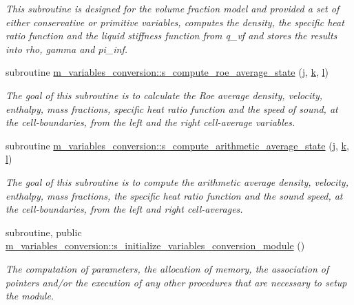 \begin{DoxyCompactItemize}
\begin{DoxyCompactList}\small\item\em This subroutine is designed for the volume fraction model and provided a set of either conservative or primitive variables, computes the density, the specific heat ratio function and the liquid stiffness function from q\+\_\+vf and stores the results into rho, gamma and pi\+\_\+inf. \end{DoxyCompactList}\item 
subroutine \hyperlink{namespacem__variables__conversion_a4cf9b21c0dfd924ac807585579240486}{m\+\_\+variables\+\_\+conversion\+::s\+\_\+compute\+\_\+roe\+\_\+average\+\_\+state} (\hyperlink{m__rhs_8f90_aeadbc0ce9b66517f8fde156199772ec1}{j}, \hyperlink{m__rhs_8f90_af22c486581933c52df7d4aa306382074}{k}, \hyperlink{m__rhs_8f90_a2ac747380de0e6e5e11b01f4137fb75c}{l})
\begin{DoxyCompactList}\small\item\em The goal of this subroutine is to calculate the Roe average density, velocity, enthalpy, mass fractions, specific heat ratio function and the speed of sound, at the cell-\/boundaries, from the left and the right cell-\/average variables. \end{DoxyCompactList}\item 
subroutine \hyperlink{namespacem__variables__conversion_a825db8aee0af3c120a7ca1f8de814490}{m\+\_\+variables\+\_\+conversion\+::s\+\_\+compute\+\_\+arithmetic\+\_\+average\+\_\+state} (\hyperlink{m__rhs_8f90_aeadbc0ce9b66517f8fde156199772ec1}{j}, \hyperlink{m__rhs_8f90_af22c486581933c52df7d4aa306382074}{k}, \hyperlink{m__rhs_8f90_a2ac747380de0e6e5e11b01f4137fb75c}{l})
\begin{DoxyCompactList}\small\item\em The goal of this subroutine is to compute the arithmetic average density, velocity, enthalpy, mass fractions, the specific heat ratio function and the sound speed, at the cell-\/boundaries, from the left and right cell-\/averages. \end{DoxyCompactList}\item 
subroutine, public \hyperlink{namespacem__variables__conversion_ac006af9a5403b2fdad7f81ce0a67ecec}{m\+\_\+variables\+\_\+conversion\+::s\+\_\+initialize\+\_\+variables\+\_\+conversion\+\_\+module} ()
\begin{DoxyCompactList}\small\item\em The computation of parameters, the allocation of memory, the association of pointers and/or the execution of any other procedures that are necessary to setup the module. \end{DoxyCompactList}\item 

\end{DoxyCompactItemize}
